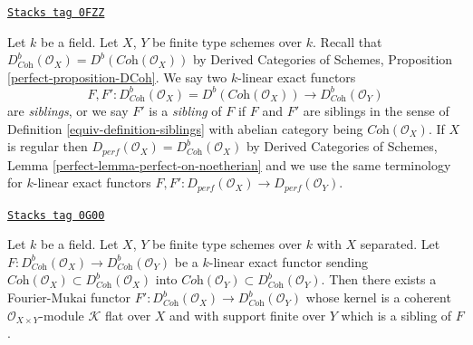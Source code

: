 \begin{definition}
\label{equiv-definition-siblings-geometric}
\href{https://stacks.math.columbia.edu/tag/0FZZ}{\texttt{Stacks tag 0FZZ}}

Let $k$ be a field. Let $X$, $Y$ be finite type schemes over $k$.
Recall that
$D^b_{\textit{Coh}}(\mathcal{O}_X) = D^b(\textit{Coh}(\mathcal{O}_X))$
by Derived Categories of Schemes, Proposition \ref{perfect-proposition-DCoh}.
We say two $k$-linear exact functors
$$
F, F' :
D^b_{\textit{Coh}}(\mathcal{O}_X) = D^b(\textit{Coh}(\mathcal{O}_X))
\longrightarrow
D^b_{\textit{Coh}}(\mathcal{O}_Y)
$$
are {\it siblings}, or we say $F'$ is a {\it sibling} of $F$ if $F$ and $F'$
are siblings in the sense of Definition \ref{equiv-definition-siblings}
with abelian category being $\textit{Coh}(\mathcal{O}_X)$.
If $X$ is regular then
$D_{perf}(\mathcal{O}_X) = D^b_{\textit{Coh}}(\mathcal{O}_X)$ by
Derived Categories of Schemes, Lemma \ref{perfect-lemma-perfect-on-noetherian}
and we use the same terminology for $k$-linear exact functors
$F, F' : D_{perf}(\mathcal{O}_X) \to D_{perf}(\mathcal{O}_Y)$.
\end{definition}

\begin{lemma}
\label{equiv-lemma-exact-functor-preserving-Coh}
\href{https://stacks.math.columbia.edu/tag/0G00}{\texttt{Stacks tag 0G00}}

Let $k$ be a field. Let $X$, $Y$ be finite type schemes over $k$ with
$X$ separated. Let
$F : D^b_{\textit{Coh}}(\mathcal{O}_X) \to D^b_{\textit{Coh}}(\mathcal{O}_Y)$
be a $k$-linear exact functor sending
$\textit{Coh}(\mathcal{O}_X) \subset D^b_{\textit{Coh}}(\mathcal{O}_X)$
into
$\textit{Coh}(\mathcal{O}_Y) \subset D^b_{\textit{Coh}}(\mathcal{O}_Y)$.
Then there exists a Fourier-Mukai functor
$F' : D^b_{\textit{Coh}}(\mathcal{O}_X) \to D^b_{\textit{Coh}}(\mathcal{O}_Y)$
whose kernel is a coherent $\mathcal{O}_{X \times Y}$-module $\mathcal{K}$
flat over $X$ and with support finite over $Y$ which is a sibling of $F$.
\end{lemma}


